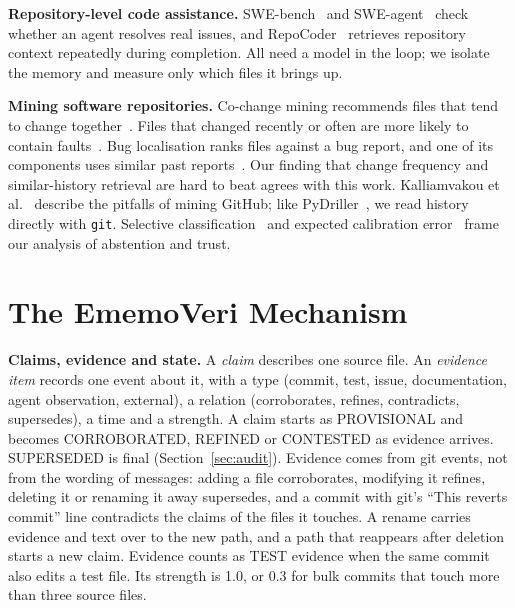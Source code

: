 \documentclass[conference]{IEEEtran}
\newcommand{\sys}{EmemoVeri}
\begin{document}
\textbf{Repository-level code assistance.} SWE-bench~\cite{jimenez2024swebench} and SWE-agent~\cite{yang2024sweagent} check whether an agent resolves real issues, and RepoCoder~\cite{zhang2023repocoder} retrieves repository context repeatedly during completion. All need a model in the loop; we isolate the memory and measure only which files it brings up.

\textbf{Mining software repositories.} Co-change mining recommends files that tend to change together~\cite{zimmermann2005mining}. Files that changed recently or often are more likely to contain faults~\cite{kim2007cache,hassan2009complexity}. Bug localisation ranks files against a bug report, and one of its components uses similar past reports~\cite{zhou2012buglocator}. Our finding that change frequency and similar-history retrieval are hard to beat agrees with this work. Kalliamvakou et al.~\cite{kalliamvakou2014perils} describe the pitfalls of mining GitHub; like PyDriller~\cite{spadini2018pydriller}, we read history directly with \texttt{git}. Selective classification~\cite{geifman2017selective} and expected calibration error~\cite{guo2017calibration} frame our analysis of abstention and trust.

\section{The \sys{} Mechanism}
\label{sec:mech}
\textbf{Claims, evidence and state.} A \emph{claim} describes one source file. An \emph{evidence item} records one event about it, with a type (commit, test, issue, documentation, agent observation, external), a relation (corroborates, refines, contradicts, supersedes), a time and a strength. A claim starts as PROVISIONAL and becomes CORROBORATED, REFINED or CONTESTED as evidence arrives. SUPERSEDED is final (Section~\ref{sec:audit}). Evidence comes from git events, not from the wording of messages: adding a file corroborates, modifying it refines, deleting it or renaming it away supersedes, and a commit with git's ``This reverts commit'' line contradicts the claims of the files it touches. A rename carries evidence and text over to the new path, and a path that reappears after deletion starts a new claim. Evidence counts as TEST evidence when the same commit also edits a test file. Its strength is 1.0, or 0.3 for bulk commits that touch more than three source files.
\end{document}
